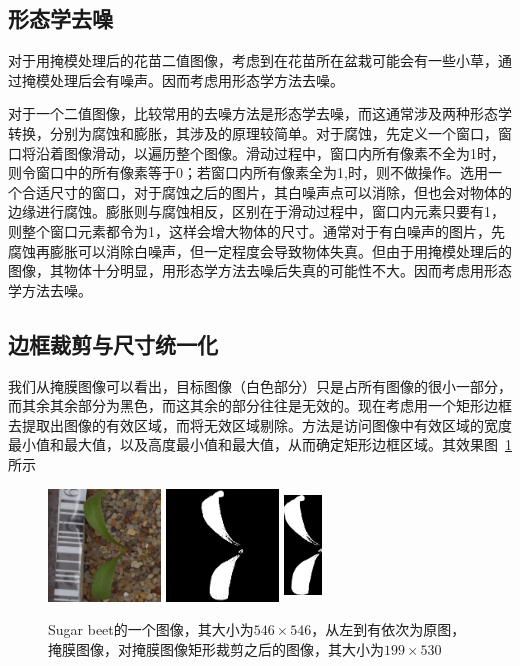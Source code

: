 \subsection{形态学去噪}
对于用掩模处理后的花苗二值图像，考虑到在花苗所在盆栽可能会有一些小草，通过掩模处理后会有噪声。因而考虑用形态学方法去噪。

对于一个二值图像，比较常用的去噪方法是形态学去噪，而这通常涉及两种形态学转换，分别为腐蚀和膨胀，其涉及的原理较简单。对于腐蚀，先定义一个窗口，窗口将沿着图像滑动，以遍历整个图像。滑动过程中，窗口内所有像素不全为1时，则令窗口中的所有像素等于0；若窗口内所有像素全为1,时，则不做操作。选用一个合适尺寸的窗口，对于腐蚀之后的图片，其白噪声点可以消除，但也会对物体的边缘进行腐蚀。膨胀则与腐蚀相反，区别在于滑动过程中，窗口内元素只要有1，则整个窗口元素都令为1，这样会增大物体的尺寸。通常对于有白噪声的图片，先腐蚀再膨胀可以消除白噪声，但一定程度会导致物体失真。但由于用掩模处理后的图像，其物体十分明显，用形态学方法去噪后失真的可能性不大。因而考虑用形态学方法去噪。
\subsection{边框裁剪与尺寸统一化}
我们从掩膜图像可以看出，目标图像（白色部分）只是占所有图像的很小一部分，而其余其余部分为黑色，而这其余的部分往往是无效的。现在考虑用一个矩形边框去提取出图像的有效区域，而将无效区域剔除。方法是访问图像中有效区域的宽度最小值和最大值，以及高度最小值和最大值，从而确定矩形边框区域。其效果图~\ref{fig:bycj}所示
\begin{figure}[htbp]
\centering
\includegraphics[width=30mm,height=30mm]{../figures/Sugar_beet_1bdfd2206.png} 
\includegraphics[width=30mm,height=30mm]{../figures/Sugar_beet_1bdfd2206_mask.png} 	
\includegraphics[width=10mm,height=30mm]{../figures/Sugar_beet_1bdfd2206_mask_tg.png}
\caption{Sugar beet的一个图像，其大小为$546\times 546$，从左到有依次为原图，掩膜图像，对掩膜图像矩形裁剪之后的图像，其大小为$199\times 530$}
\label{fig:bycj} 
\end{figure}

